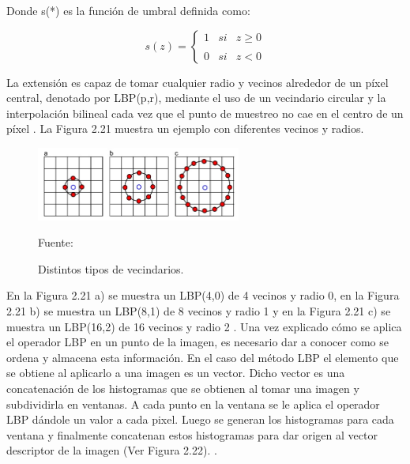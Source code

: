 \begin{enumerate}
Donde s(*) es la función de umbral definida como:

\begin{equation}
s(z)= \left\{ \begin{array}{lcc}
             1 & si & z \geqslant 0 \\
             \\ 0 & si & z<0 
             \end{array}
   \right.
\end{equation}

La extensión es capaz de tomar cualquier radio y vecinos alrededor de un píxel central, denotado por LBP(p,r),  mediante el uso de un vecindario circular y la interpolación bilineal cada vez que el punto de muestreo no cae en el centro de un píxel \citep{Adams}. La Figura 2.21 muestra un ejemplo con diferentes vecinos y radios.

\begin{figure}[ht]
\begin{center}
\includegraphics[width=0.6\textwidth]{Imagen22}
\end{center}
\begin{center}
\vskip -0.5cm
\caption{\small{Distintos tipos de vecindarios.}}
{\small{Fuente: \cite{Adams}}}
\end{center}
\end{figure}

En la Figura 2.21 a) se muestra un LBP(4,0) de 4 vecinos y radio 0, en la Figura 2.21 b) se muestra un LBP(8,1) de 8 vecinos y radio 1 y en la Figura 2.21 c) se muestra un LBP(16,2) de 16 vecinos y radio 2 \citep{Adams}.
\vskip 0.1cm
Una vez explicado cómo se aplica el operador LBP en un punto de la imagen, es necesario dar a conocer como se ordena y almacena esta información. En el caso del método LBP el elemento que se obtiene al aplicarlo a una imagen es un vector. Dicho vector es una concatenación de los histogramas que se obtienen al tomar una imagen y subdividirla en ventanas. A cada punto en la ventana se le aplica el operador LBP dándole un valor a cada pixel. Luego se generan los histogramas para cada ventana y finalmente concatenan estos histogramas para dar origen al vector descriptor de la imagen (Ver Figura 2.22). \citep{Adams}. 


\end{enumerate}
